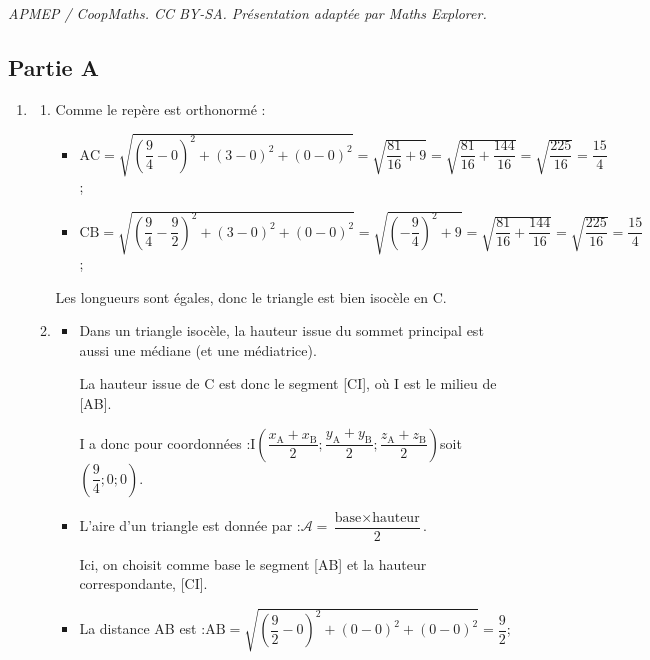 \documentclass[10pt]{article}
\begin{document}
\noindent\textit{APMEP / CoopMaths. CC BY-SA. Présentation adaptée par Maths Explorer.}\par\medskip
\subsection*{Partie A}
\begin{enumerate}
\item 
	\begin{enumerate}
			\item 
			
			
			Comme le repère est orthonormé :
			\begin{itemize}
				\item $\mathrm{AC} = \sqrt{\left(\dfrac{9}{4}-0\right)^2 + (3-0)^2 + (0 - 0)^2} =\sqrt{\dfrac{81}{16}+ 9} =\sqrt{ \dfrac{81}{16} + \dfrac{144 }{16}} = \sqrt{\dfrac{225}{16}}=\dfrac{15}{4} $;
				\item $\mathrm{CB} = \sqrt{\left(\dfrac{9}{4}-\dfrac{9}{2}\right)^2 + (3-0)^2 + (0 - 0)^2} =\sqrt{\left(-\dfrac{9}{4}\right)^2+ 9} =\sqrt{ \dfrac{81}{16} + \dfrac{144 }{16}} = \sqrt{\dfrac{225}{16}}=\dfrac{15}{4} $;
			\end{itemize}
			
			Les longueurs sont égales, donc le triangle est bien isocèle en C.
			
			\item  \begin{itemize}
				\item  Dans un triangle isocèle, la hauteur issue du sommet principal est aussi une médiane (et une médiatrice).
			
			La hauteur issue de C est donc le segment [CI], où I est le milieu de [AB].
			
			I a donc pour coordonnées :\quad I$\left(\dfrac{x_{\mathrm{A}} + x_{\mathrm{B}}}{2} ; \dfrac{y_{\mathrm{A}} + y_{\mathrm{B}}}{2} ; \dfrac{z_{\mathrm{A}} + z_{\mathrm{B}}}{2}\right) $\quad soit \quad $\left(\dfrac{9}{4} ; 0 ; 0\right)$.
			
			\item L'aire d'un triangle est donnée par :\quad $\mathcal{A} = \dfrac{\text{base} \times \text{hauteur}
			}{2}$.
			
			Ici, on choisit comme base le segment [AB] et la hauteur correspondante, [CI].
			
			\item La distance AB est :\quad $\mathrm{AB} = \sqrt{\left(\dfrac{9}{2}-0\right)^2 + (0-0)^2 + (0 - 0)^2} =\dfrac{9}{2} $;
			

\end{itemize}
\end{enumerate}
\end{enumerate}
\end{document}
